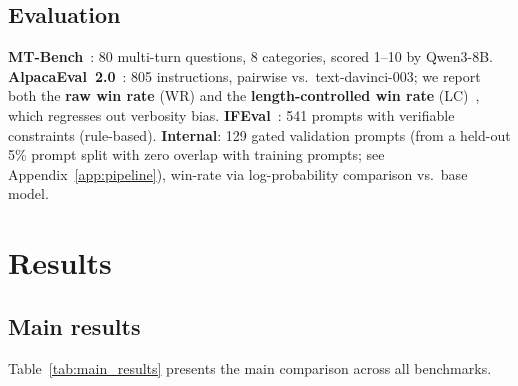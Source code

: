 \documentclass{article}
\begin{document}
\subsection{Evaluation}

\textbf{MT-Bench}~\citep{zheng2023judging}: 80 multi-turn questions, 8 categories, scored 1--10 by Qwen3-8B.
\textbf{AlpacaEval~2.0}~\citep{li2023alpacaeval}: 805 instructions, pairwise vs.\ text-davinci-003; we report both the \textbf{raw win rate} (WR) and the \textbf{length-controlled win rate} (LC)~\citep{dubois2024lengthcontrolled}, which regresses out verbosity bias.
\textbf{IFEval}~\citep{zhou2023ifeval}: 541 prompts with verifiable constraints (rule-based).
\textbf{Internal}: 129 gated validation prompts (from a held-out 5\% prompt split with zero overlap with training prompts; see Appendix~\ref{app:pipeline}), win-rate via log-probability comparison vs.\ base model.


\section{Results}
\label{sec:results}

\subsection{Main results}

Table~\ref{tab:main_results} presents the main comparison across all benchmarks.
\end{document}
